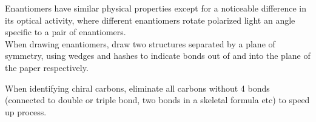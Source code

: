 \documentclass[../main]{subfiles}
\begin{document}

	Enantiomers have similar physical properties except for a noticeable difference in its optical activity, where different enantiomers rotate polarized light an angle specific to a pair of enantiomers. \\

	When drawing enantiomers, draw two structures separated by a plane of symmetry, using wedges and hashes to indicate bonds out of and into the plane of the paper respectively.


	When identifying chiral carbons, eliminate all carbons without 4 bonds (connected to double or triple bond, two bonds in a skeletal formula etc) to speed up process.

\end{document}
